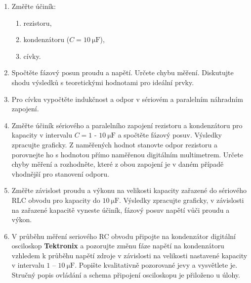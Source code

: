 \documentclass[0-protokol.tex]{subfiles}
\begin{document}
\begin{enumerate}
\item Změřte účiník:
\begin{enumerate}
\item rezistoru,
\item kondenzátoru ($C = \SI{10}{\micro\farad}$),
\item cívky.
\end{enumerate}
\item Spočtěte fázový posun proudu a napětí. Určete chybu měření. Diskutujte shodu výsledků s teoretickými hodnotami pro ideální prvky.
\item Pro cívku vypočtěte indukčnost a odpor v sériovém a paralelním náhradním zapojení.
\item Změřte účiník sériového a paralelního zapojení rezistoru a kondenzátoru pro kapacity v intervalu $C = 1$ - $\SI{10}{\micro\farad}$ a spočtěte fázový posuv. Výsledky zpracujte graficky. Z naměřených hodnot stanovte odpor rezistoru a porovnejte ho s hodnotou přímo naměřenou digitálním multimetrem. Určete chyby měření a rozhodněte, které z obou zapojení je v daném případě vhodnější pro stanovení odporu.
\item Změřte závislost proudu a výkonu na velikosti kapacity zařazené do sériového RLC obvodu pro kapacity do $\SI{10}{\micro\farad}$. Výsledky zpracujte graficky, v závislosti na zařazené kapacitě vyneste účiník, fázový posuv napětí vůči proudu a výkon.
\item V průběhu měření seriového RC obvodu připojte na kondenzátor digitální osciloskop \textbf{Tektronix} a pozorujte změnu fáze napětí na kondenzátoru vzhledem k průběhu napětí zdroje v závislosti na velikosti nastavené kapacity v intervalu $1$ – $\SI{10}{\micro\farad}$. Popište kvalitativně pozorované jevy a vysvětlete je. Stručný popis ovládání a schema připojení osciloskopu je přiloženo u úlohy.
\end{enumerate}
\end{document}
